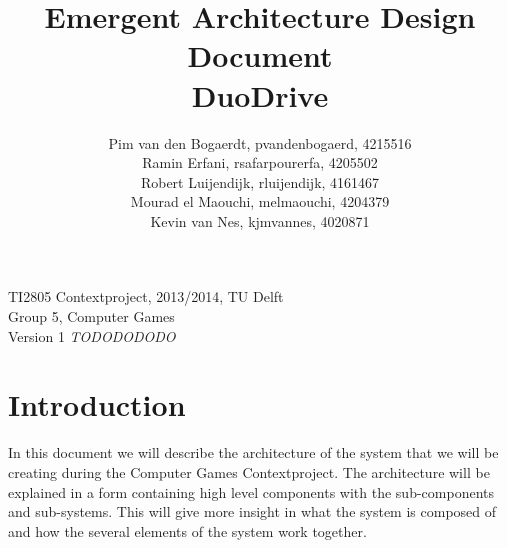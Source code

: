 \documentclass[11pt,twoside,a4paper]{article}
\title{
  Emergent Architecture Design Document\\
  DuoDrive
}
\author{
	Pim van den Bogaerdt, pvandenbogaerd, 4215516\\
	Ramin Erfani, rsafarpourerfa, 4205502\\
	Robert Luijendijk, rluijendijk, 4161467\\
	Mourad el Maouchi, melmaouchi, 4204379\\
	Kevin van Nes, kjmvannes, 4020871
}
\begin{document}
\maketitle
\begin{center}
TI2805 Contextproject, 2013/2014, TU Delft\\
Group 5, Computer Games\\
Version 1 \emph{TODODODODO}
\end{center}
\clearpage

\section{Introduction}
In this document we will describe the architecture of the system that we will be creating during the Computer Games Contextproject. The architecture will be explained in a form containing high level components with the sub-components and sub-systems. This will give more insight in what the system is composed of and how the several elements of the system work together. 
\end{document}
